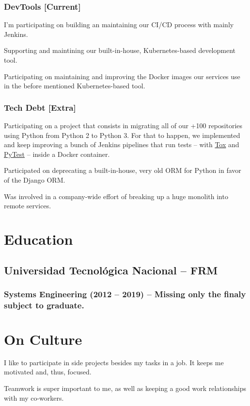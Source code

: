 \documentclass{article}
\begin{document}
\subsubsection{DevTools [Current]}
  \begin{description}
    \item I'm participating on building an maintaining our CI/CD process with mainly Jenkins.
    \item Supporting and maintining our built-in-house, Kubernetes-based development tool.
    \item Participating on maintaining and improving the Docker images our services use in the before mentioned Kubernetes-based tool.
  \end{description}
\subsubsection{Tech Debt [Extra]}
  \begin{description}
    \item Participating on a project that consists in migrating all of our +100 repositories using Python from Python 2 to Python 3.
      For that to happen, we implemented and keep improving a bunch of Jenkins pipelines that run tests – with \href{https://tox.readthedocs.io/en/latest/}{Tox} and \href{https://docs.pytest.org/en/latest/}{PyTest} – inside a Docker container.
    \item Participated on deprecating a built-in-house, very old ORM for Python in favor of the Django ORM.
    \item Was involved in a company-wide effort of breaking up a huge monolith into remote services.
  \end{description}
\section{Education}
\subsection{Universidad Tecnológica Nacional – FRM}
\subsubsection{Systems Engineering (2012 – 2019) – Missing only the finaly subject to graduate.}
\section{On Culture}
  \begin{description}
    \item I like to participate in side projects besides my tasks in a job. It keeps me motivated and, thus, focused.
    \item Teamwork is super important to me, as well as keeping a good work relationships with my co-workers.
  \end{description}
\end{document}

